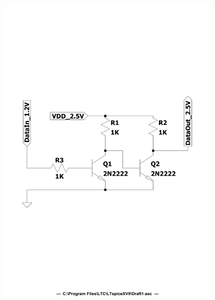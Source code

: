 \documentclass[aspectratio=169]{beamer}
\begin{document}
\begin{frame}
\begin{columns}
\begin{figure}
			\includegraphics[width=0.6 \textwidth]{IMG/Diagram_cropped.pdf}
		\end{figure}
	\end{columns}
				
	
	
	\end{frame}
\end{document}
